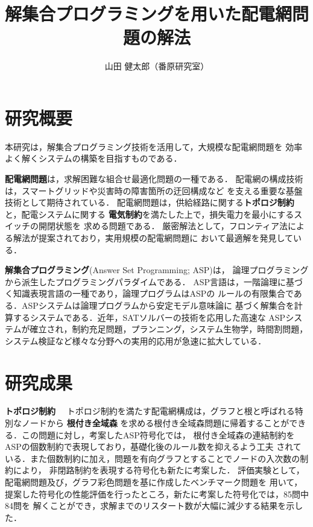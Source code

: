 \documentclass[a4j,10pt,dvipdfmx]{jarticle}
\title{解集合プログラミングを用いた配電網問題の解法}
\author{山田 健太郎（番原研究室）}
\date{}
\newcommand{\mysection}[1]{\vspace{-15pt}\section{#1}}
\begin{document}
\maketitle
\thispagestyle{empty}
\begin{multicols}{1}

\section{研究概要}
本研究は，解集合プログラミング技術を活用して，大規模な配電網問題を
効率よく解くシステムの構築を目指すものである．

\textbf{配電網問題}は，求解困難な組合せ最適化問題の一種である．
配電網の構成技術は，スマートグリッドや災害時の障害箇所の迂回構成など
を支える重要な基盤技術として期待されている．
配電網問題は，供給経路に関する\textbf{トポロジ制約}と，配電システムに関する
\textbf{電気制約}を満たした上で，損失電力を最小にするスイッチの開閉状態を
求める問題である．
厳密解法として，フロンティア法による解法が提案されており，実用規模の配電網問題に
おいて最適解を発見している\cite{Minato:dnet:ZDD}．

\textbf{解集合プログラミング}(Answer Set Programming; ASP\cite{inoue08:jssst})は，
論理プログラミングから派生したプログラミングパラダイムである．
ASP言語は，一階論理に基づく知識表現言語の一種であり，論理プログラムはASPの
ルールの有限集合である．ASPシステムは論理プログラムから安定モデル意味論に
基づく解集合を計算するシステムである．近年，SATソルバーの技術を応用した高速な
ASPシステムが確立され，制約充足問題，プランニング，システム生物学，時間割問題，
システム検証など様々な分野への実用的応用が急速に拡大している．

\mysection{研究成果}
\textbf{トポロジ制約}~~
トポロジ制約を満たす配電網構成は，グラフと根と呼ばれる特別なノードから
\textbf{根付き全域森}\cite{Minato:dnet:netuki}
を求める根付き全域森問題に帰着することができる．この問題に対し，考案したASP符号化では， 
根付き全域森の連結制約をASPの個数制約で表現しており，基礎化後のルール数を抑えるよう工夫
されている．また個数制約に加え，問題を有向グラフとすることでノードの入次数の制約により，
非閉路制約を表現する符号化も新たに考案した．
評価実験として，配電網問題及び，グラフ彩色問題を基に作成したベンチマーク問題を
用いて，提案した符号化の性能評価を行ったところ，新たに考案した符号化では，85問中84問を
解くことができ，求解までのリスタート数が大幅に減少する結果を示した．



\end{multicols}
\end{document}
